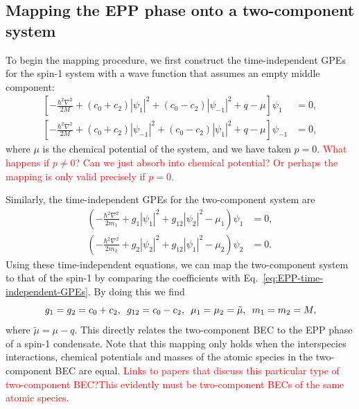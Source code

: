 \subsection{Mapping the EPP phase onto a two-component system}
To begin the mapping procedure, we first construct the time-independent
GPEs for the spin-1 system with a wave function that assumes an empty middle
component:
\begin{equation}
    \begin{aligned}
        \left[-\frac{\hbar^2\nabla^2}{2M}
            + (c_0 + c_2)|\psi_1|^2 + (c_0 - c_2)|\psi_{-1}|^2
        + q - \mu\right]\psi_1    & = 0, \\
        \left[-\frac{\hbar^2\nabla^2}{2M}
            + (c_0 + c_2)|\psi_{-1}|^2 + (c_0 - c_2)|\psi_1|^2
        + q - \mu\right]\psi_{-1} & = 0,
    \end{aligned}
    \label{eq:EPP-time-independent-GPEs}
\end{equation}
where \( \mu \) is the chemical potential of the system, and we have taken
\( p=0 \).
\textcolor{red}{What happens if \(p \neq 0\)? Can we just absorb into chemical
    potential? Or perhaps the mapping is only valid precisely if \(p = 0\).}

Similarly, the time-independent GPEs for the two-component system are
\begin{equation}
    \begin{aligned}
        \left(-\frac{\hbar^2\nabla^2}{2m_1} + g_1|\psi_1|^2
        +g_{12}|\psi_2|^2 - \mu_1\right)\psi_1 & = 0, \\
        \left(-\frac{\hbar^2\nabla^2}{2m_2} + g_2|\psi_2|^2
        +g_{12}|\psi_1|^2 - \mu_2\right)\psi_2 & = 0.
    \end{aligned}
    \label{eq:two-comp-time-independent-gpes}
\end{equation}
Using these time-independent equations, we can map the two-component system
to that of the spin-1 by comparing the coefficients with
Eq.~\eqref{eq:EPP-time-independent-GPEs}.
By doing this we find
\begin{equation}
    g_1=g_2=c_0+c_2, \enskip g_{12} = c_0-c_2, \enskip \mu_1=\mu_2=\tilde{\mu},
    \enskip m_1=m_2=M,
\end{equation}
where \( \tilde{\mu} = \mu - q \).
This directly relates the two-component BEC to the EPP phase of a spin-1
condensate.
Note that this mapping only holds when the interspecies interactions, chemical
potentials and masses of the atomic species in the two-component BEC are equal.
\textcolor{red}{Links to papers that discuss this particular type of
    two-component BEC?\@ This evidently must be two-component BECs of the same
    atomic species.}


